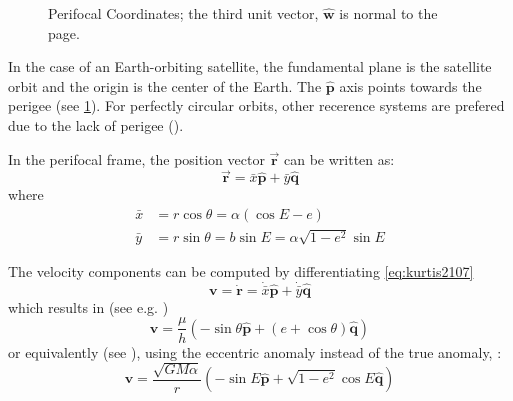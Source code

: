 \begin{figure}
\centering
{}

\caption{Perifocal Coordinates; the third unit vector, $\hat{\bm{w}}$ is 
         normal to the page.}
\label{fig:eccentric-anomaly}
\end{figure}


In the case of an Earth-orbiting satellite, the fundamental plane is the 
satellite orbit and the origin is the center of the Earth. The $\hat{\bm{p}}$ 
axis points towards the perigee (see \ref{fig:eccentric-anomaly}). For 
perfectly circular orbits, other recerence systems are prefered due to the 
lack of perigee (\cite{Vallado}).

In the perifocal frame, the position vector $\vec{\bm{r}}$ can be written as:
\begin{equation}
  \label{eq:kurtis2107}
  \vec{\bm{r}} = \bar{x} \hat{\bm{p}} + \bar{y} \hat{\bm{q}}
\end{equation}
where
\begin{subequations}
  \begin{align}
  \label{eq:mong230a}
  \bar{x} &= r \cos \theta = \alpha ( \cos E - e ) \\
  \label{eq:mong230b}
  \bar{y} &= r \sin \theta = b \sin E = \alpha \sqrt{1-e^2} \sin E
  \end{align}
\end{subequations}

The velocity components can be computed by differentiating \ref{eq:kurtis2107}
\begin{equation}
  \bm{v} = \dot{\bm{r}} = \dot{\bar{x}} \hat{\bm{p}} + \dot{\bar{y}} \hat{\bm{q}}
\end{equation}
which results in (see e.g. \cite{curtisb})
\begin{equation}
  \bm{v} = \frac{\mu}{h} \left( -\sin \theta \hat{\bm{p}}
    + (e + \cos \theta ) \hat{\bm{q}} \right)
\end{equation}
or equivalently (see \cite{Montenbruck2000}), using the eccentric anomaly 
instead of the true anomaly, :
\begin{equation}
  \bm{v} = \frac{\sqrt{G M \alpha }}{r} \left( -\sin E \hat{\bm{p}} 
   + \sqrt{1 - e^2} \cos E \hat{\bm{q}} \right)
\end{equation}

